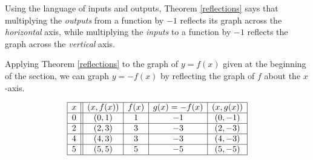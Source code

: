 \smallskip

Using the  language of inputs and outputs, Theorem \ref{reflections} says that multiplying the \textit{outputs} from a function by $-1$ reflects its graph across the \textit{horizontal} axis, while multiplying the \textit{inputs} to a function by $-1$ reflects the graph across the \textit{vertical} axis.

\smallskip

Applying Theorem \ref{reflections} to the graph of $y=f(x)$ given at the beginning of the section, we can graph $y=-f(x)$ by reflecting the graph of $f$ about the $x$-axis.

\[ \begin{array}{|c||c|c|c|c|}  

\hline

 x & (x,f(x)) & f(x) & g(x)=-f(x) & (x, g(x)) \\ \hline
0  & (0,1)& 1 & -1 &(0, -1) \\  \hline
2 & (2,3) & 3 &  -3 &(2,-3) \\  \hline
4 & (4,3) & 3 &  -3&(4, -3) \\  \hline
5 & (5,5) & 5 &  -5 &( 5 ,-5) \\  \hline

\end{array} \] 

